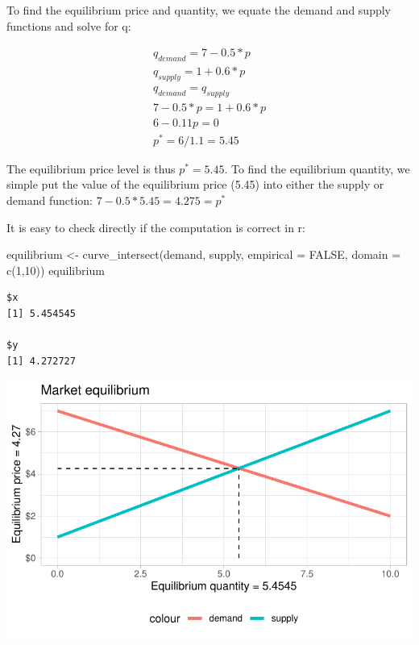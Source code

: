 \documentclass[
  letterpaper,
  DIV=11,
  numbers=noendperiod]{scrreprt}
\newenvironment{Shaded}{\begin{snugshade}}{\end{snugshade}}
\newcommand{\AttributeTok}[1]{\textcolor[rgb]{0.40,0.45,0.13}{#1}}
\newcommand{\ConstantTok}[1]{\textcolor[rgb]{0.56,0.35,0.01}{#1}}
\newcommand{\DecValTok}[1]{\textcolor[rgb]{0.68,0.00,0.00}{#1}}
\newcommand{\FunctionTok}[1]{\textcolor[rgb]{0.28,0.35,0.67}{#1}}
\newcommand{\NormalTok}[1]{\textcolor[rgb]{0.00,0.23,0.31}{#1}}
\newcommand{\OtherTok}[1]{\textcolor[rgb]{0.00,0.23,0.31}{#1}}
\begin{document}
To find the equilibrium price and quantity, we equate the demand and
supply functions and solve for q:

\[
\begin{aligned}
q_{demand} = 7- 0.5*p
\\
q_{supply} = 1 + 0.6*p 
\\
q_{demand} = q_{supply}
\\
7 - 0.5*p = 1 + 0.6*p
\\
6-0.11p = 0
\\
p^* = 6/1.1 = 5.45
\end{aligned}
\]

The equilibrium price level is thus \(p^* = 5.45\). To find the
equilibrium quantity, we simple put the value of the equilibrium price
(5.45) into either the supply or demand function:
\(7-0.5*5.45 = 4.275 = p^*\)

It is easy to check directly if the computation is correct in r:

\begin{Shaded}
\begin{Highlighting}[]
\NormalTok{equilibrium }\OtherTok{\textless{}{-}} \FunctionTok{curve\_intersect}\NormalTok{(demand, supply, }\AttributeTok{empirical =} \ConstantTok{FALSE}\NormalTok{, }\AttributeTok{domain =} \FunctionTok{c}\NormalTok{(}\DecValTok{1}\NormalTok{,}\DecValTok{10}\NormalTok{))}
\NormalTok{equilibrium}
\end{Highlighting}
\end{Shaded}

\begin{verbatim}
$x
[1] 5.454545

$y
[1] 4.272727
\end{verbatim}

\includegraphics{intro_files/figure-pdf/unnamed-chunk-5-1.pdf}
\end{document}
